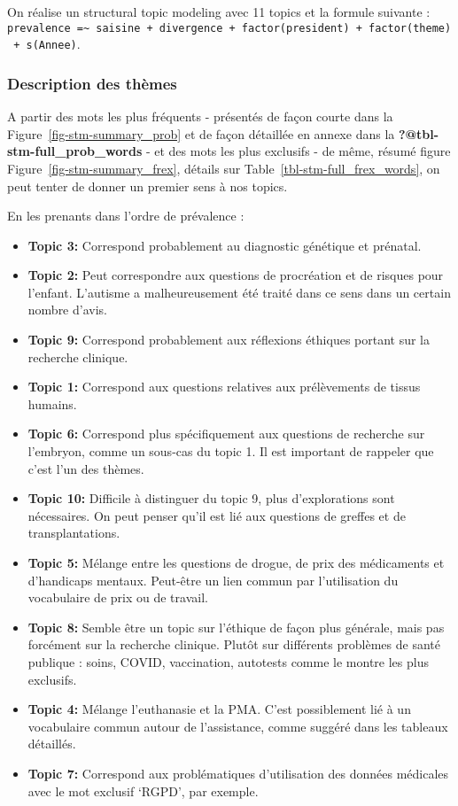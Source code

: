 \documentclass[
  letterpaper,
  DIV=11,
  numbers=noendperiod]{scrartcl}
\begin{document}
On réalise un structural topic modeling avec 11 topics et la formule
suivante :
\texttt{prevalence\ =\textasciitilde{}\ saisine\ +\ divergence\ +\ factor(president)\ +\ factor(theme)\ +\ s(Annee)}.

\hypertarget{description-des-thuxe8mes}{%
\subsubsection{Description des thèmes}\label{description-des-thuxe8mes}}

A partir des mots les plus fréquents - présentés de façon courte dans la
Figure~\ref{fig-stm-summary_prob} et de façon détaillée en annexe dans
la \textbf{?@tbl-stm-full\_prob\_words} - et des mots les plus exclusifs
- de même, résumé figure Figure~\ref{fig-stm-summary_frex}, détails sur
Table~\ref{tbl-stm-full_frex_words}, on peut tenter de donner un premier
sens à nos topics.

En les prenants dans l'ordre de prévalence :

\begin{itemize}
\item
  \textbf{Topic 3:} Correspond probablement au diagnostic génétique et
  prénatal.
\item
  \textbf{Topic 2:} Peut correspondre aux questions de procréation et de
  risques pour l'enfant. L'autisme a malheureusement été traité dans ce
  sens dans un certain nombre d'avis.
\item
  \textbf{Topic 9:} Correspond probablement aux réflexions éthiques
  portant sur la recherche clinique.
\item
  \textbf{Topic 1:} Correspond aux questions relatives aux prélèvements
  de tissus humains.
\item
  \textbf{Topic 6:} Correspond plus spécifiquement aux questions de
  recherche sur l'embryon, comme un sous-cas du topic 1. Il est
  important de rappeler que c'est l'un des thèmes.
\item
  \textbf{Topic 10:} Difficile à distinguer du topic 9, plus
  d'explorations sont nécessaires. On peut penser qu'il est lié aux
  questions de greffes et de transplantations.
\item
  \textbf{Topic 5:} Mélange entre les questions de drogue, de prix des
  médicaments et d'handicaps mentaux. Peut-être un lien commun par
  l'utilisation du vocabulaire de prix ou de travail.
\item
  \textbf{Topic 8:} Semble être un topic sur l'éthique de façon plus
  générale, mais pas forcément sur la recherche clinique. Plutôt sur
  différents problèmes de santé publique : soins, COVID, vaccination,
  autotests comme le montre les plus exclusifs.
\item
  \textbf{Topic 4:} Mélange l'euthanasie et la PMA. C'est possiblement
  lié à un vocabulaire commun autour de l'assistance, comme suggéré dans
  les tableaux détaillés.
\item
  \textbf{Topic 7:} Correspond aux problématiques d'utilisation des
  données médicales avec le mot exclusif `RGPD', par exemple.
\end{itemize}
\end{document}
